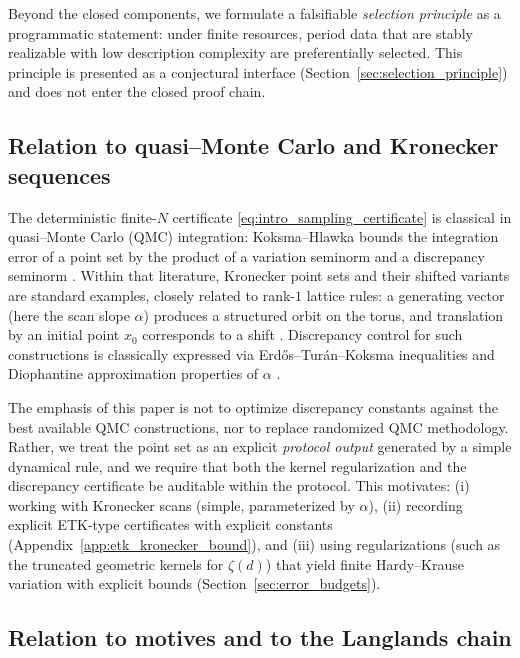 Beyond the closed components, we formulate a falsifiable \emph{selection principle} as a programmatic statement: under finite resources, period data that are stably realizable with low description complexity are preferentially selected. This principle is presented as a conjectural interface (Section~\ref{sec:selection_principle}) and does not enter the closed proof chain.

\subsection{Relation to quasi--Monte Carlo and Kronecker sequences}
\label{sec:relation_to_qmc}

The deterministic finite-$N$ certificate \eqref{eq:intro_sampling_certificate} is classical in quasi--Monte Carlo (QMC) integration: Koksma--Hlawka bounds the integration error of a point set by the product of a variation seminorm and a discrepancy seminorm \cite{KuipersNiederreiter1974,Niederreiter1992,DickPillichshammer2010}. Within that literature, Kronecker point sets and their shifted variants are standard examples, closely related to rank-$1$ lattice rules: a generating vector (here the scan slope $\alpha$) produces a structured orbit on the torus, and translation by an initial point $x_0$ corresponds to a shift \cite{SloanJoe1994,DickPillichshammer2010}. Discrepancy control for such constructions is classically expressed via Erd\H{o}s--Tur\'an--Koksma inequalities and Diophantine approximation properties of $\alpha$ \cite{KuipersNiederreiter1974,DrmotaTichy1997,Niederreiter1992,DickPillichshammer2010}.

The emphasis of this paper is not to optimize discrepancy constants against the best available QMC constructions, nor to replace randomized QMC methodology. Rather, we treat the point set as an explicit \emph{protocol output} generated by a simple dynamical rule, and we require that both the kernel regularization and the discrepancy certificate be auditable within the protocol. This motivates: (i) working with Kronecker scans (simple, parameterized by $\alpha$), (ii) recording explicit ETK-type certificates with explicit constants (Appendix~\ref{app:etk_kronecker_bound}), and (iii) using regularizations (such as the truncated geometric kernels for $\zeta(d)$) that yield finite Hardy--Krause variation with explicit bounds (Section~\ref{sec:error_budgets}).

\subsection{Relation to motives and to the Langlands chain}
\label{sec:relation_to_motives_and_langlands}

